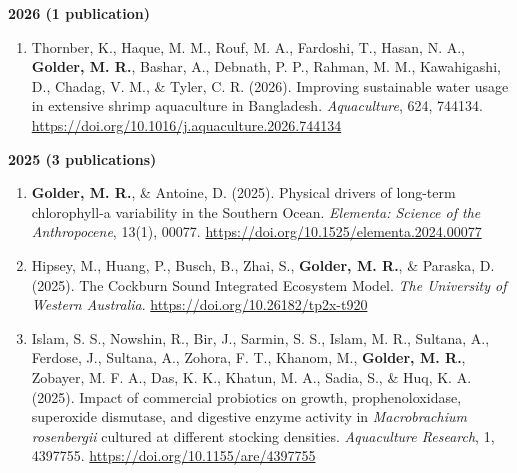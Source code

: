 \documentclass[11pt,a4paper,sans]{moderncv}
\begin{document}
\textbf{2026 (1 publication)}
\begin{enumerate}
  \item Thornber, K., Haque, M. M., Rouf, M. A., Fardoshi, T., Hasan, N. A., \textbf{Golder, M. R.}, Bashar, A., Debnath, P. P., Rahman, M. M., Kawahigashi, D., Chadag, V. M., \& Tyler, C. R. (2026). Improving sustainable water usage in extensive shrimp aquaculture in Bangladesh. \textit{Aquaculture}, 624, 744134. \url{https://doi.org/10.1016/j.aquaculture.2026.744134}
\end{enumerate}

\textbf{2025 (3 publications)}
\begin{enumerate}
  \item \textbf{Golder, M. R.}, \& Antoine, D. (2025). Physical drivers of long-term chlorophyll-a variability in the Southern Ocean. \textit{Elementa: Science of the Anthropocene}, 13(1), 00077. \url{https://doi.org/10.1525/elementa.2024.00077}

  \item Hipsey, M., Huang, P., Busch, B., Zhai, S., \textbf{Golder, M. R.}, \& Paraska, D. (2025). The Cockburn Sound Integrated Ecosystem Model. \textit{The University of Western Australia}. \url{https://doi.org/10.26182/tp2x-t920}

  \item Islam, S. S., Nowshin, R., Bir, J., Sarmin, S. S., Islam, M. R., Sultana, A., Ferdose, J., Sultana, A., Zohora, F. T., Khanom, M., \textbf{Golder, M. R.}, Zobayer, M. F. A., Das, K. K., Khatun, M. A., Sadia, S., \& Huq, K. A. (2025). Impact of commercial probiotics on growth, prophenoloxidase, superoxide dismutase, and digestive enzyme activity in \textit{Macrobrachium rosenbergii} cultured at different stocking densities. \textit{Aquaculture Research}, 1, 4397755. \url{https://doi.org/10.1155/are/4397755}
\end{enumerate}
\end{document}
